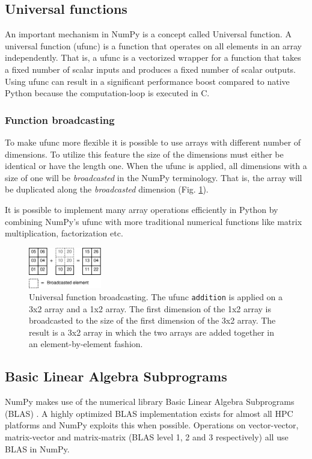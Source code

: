 \documentclass{sigplanconf}
\begin{document}
\subsection{Universal functions}
An important mechanism in NumPy is a concept called Universal function. A universal function (ufunc) is a function that operates on all elements in an array independently. That is, a ufunc is a vectorized wrapper for a function that takes a fixed number of scalar inputs and produces a fixed number of scalar outputs. Using ufunc can result in a significant performance boost compared to native Python because the computation-loop is executed in C.

\subsubsection{Function broadcasting}
To make ufunc more flexible it is possible to use arrays with different number of dimensions. To utilize this feature the size of the dimensions must either be identical or have the length one. When the ufunc is applied, all dimensions with a size of one will be \emph{broadcasted} in the NumPy terminology. That is, the array will be duplicated along the \emph{broadcasted} dimension (Fig. \ref{fig:ufunc_broadcast}).

It is possible to implement many array operations efficiently in Python by combining NumPy's ufunc with more traditional numerical functions like matrix multiplication, factorization etc.

\begin{figure}
 \centering
 \includegraphics[width=120px]{gfx/ufunc_broadcast}
 \caption{Universal function broadcasting. The ufunc \texttt{addition} is applied on a 3x2 array and a 1x2 array. The first dimension of the 1x2 array is broadcasted to the size of the first dimension of the 3x2 array. The result is a 3x2 array in which the two arrays are added together in an element-by-element fashion.}
 \label{fig:ufunc_broadcast}
\end{figure}


\subsection{Basic Linear Algebra Subprograms}
NumPy makes use of the numerical library Basic Linear Algebra Subprograms (BLAS) \cite{blas79}. A highly optimized BLAS implementation exists for almost all HPC platforms and NumPy exploits this when possible. Operations on vector-vector, matrix-vector and matrix-matrix (BLAS level 1, 2 and 3 respectively) all use BLAS in NumPy. 
\end{document}
